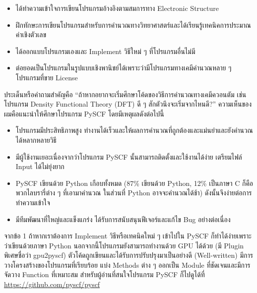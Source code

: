 \begin{itemize}[topsep=0pt]
  \item ได้ทำความเข้าใจการเขียนโปรแกรมอ้างอิงตามสมการทาง Electronic Structure

  \item ฝึกทักษะการเขียนโปรแกรมสำหรับการคำนวณทางวิทยาศาสตร์และได้เรียนรู้เทคนิคการประมาณค่าเชิงตัวเลข

  \item ได้ออกแบบโปรแกรมเองและ Implement วิธีใหม่ ๆ ที่โปรแกรมอื่นไม่มี

  \item ต่อยอดเป็นโปรแกรมในรูปแบบเชิงพานิชย์ได้เพราะว่ามีโปรแกรมทางเคมีคำนวณหลาย ๆ โปรแกรมที่ขาย License
\end{itemize}

ประเด็นหรือคำถามสำคัญคือ \enquote{ถ้าหากอยากจะเริ่มศึกษาโค้ดของวิธีการคำนวณทางเคมีควอนตัม เช่น โปรแกรม Density Functional
  Theory (DFT) ดี ๆ สักตัวนึงจะเริ่มจากไหนดี?} ความเห็นของผมคือแนะนำให้ศึกษาโปรแกรม PySCF โดยมีเหตุผลดังต่อไปนี้

\begin{itemize}[topsep=0pt]
  \item โปรแกรมมีประสิทธิภาพสูง ทำงานได้เร็วและให้ผลการคำนวณที่ถูกต้องและแม่นยำและยังคำนวณได้หลากหลายวิธี

  \item มีผู้ใช้งานเยอะเนื่องจากว่าโปรแกรม PySCF นั้นสามารถติดตั้งและใช้งานได้ง่าย เตรียมไฟล์ Input ได้ไม่ยุ่งยาก

  \item PySCF เขียนด้วย Python เกือบทั้งหมด (87\% เขียนด้วย Python, 12\% เป็นภาษา C ก็คือพวกไลบรารี่ต่าง ๆ ที่เอามาคำนวณ%
        ในส่วนที่ Python อาจจะคำนวณได้ช้า) ดังนั้นจึงง่ายต่อการทำความเข้าใจ

  \item มีทีมพัฒนาที่ใหญ่และแข็งแกร่ง ได้รับการสนับสนุนฟีเจอร์และแก้ไข Bug อย่างต่อเนื่อง
\end{itemize}

\noindent จากข้อ 1 ถ้าหากเราต้องการ Implement วิธีหรือเทคนิคใหม่ ๆ เข้าไปใน PySCF ก็ทำได้ง่ายเพราะว่าเขียนด้วยภาษา Python
นอกจากนี้โปรแกรมยังสามารถทำงานด้วย GPU ได้ด้วย (มี Plugin พิเศษชื่อว่า gpu2pyscf) ตัวโค้ดถูกเขียนและได้รับการปรับปรุงมาเป็นอย่างดี
(Well-written) มีการวางโครงสร้างของโปรแกรมที่เรียบร้อย แบ่ง Methods ต่าง ๆ ออกเป็น Module ที่ชัดเจนและมีการจัดวาง Function
ที่เหมาะสม สำหรับผู้อ่านที่สนใจโปรแกรม PySCF ก็ไปดูได้ที่ \url{https://github.com/pyscf/pyscf}

